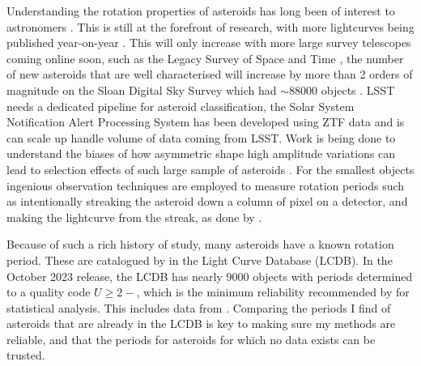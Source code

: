 \documentclass[12pt]{article}
\begin{document}
Understanding the rotation properties of asteroids has long been of interest to astronomers \citep[e.g.][for early work into the limits of rotation period and the tumbling nature of some small bodies]{Weidenschilling1981,Harris1994}.
This is still at the forefront of research, with more lightcurves being published year-on-year \citep{Harris2015}.
This will only increase with more large survey telescopes coming online soon, such as the Legacy Survey of Space and Time \citep[LSST][]{LSST2019}, the number of new asteroids that are well characterised will increase by more than 2 orders of magnitude on the Sloan Digital Sky Survey \citep[SDSS][]{York2000} which had $\sim 88000$ objects \citet{Parker2008}.
LSST needs a dedicated pipeline for asteroid classification, the Solar System Notification Alert Processing System \citep[SNAPS][]{Trilling2023} has been developed using ZTF data and is can scale up handle volume of data coming from LSST.
Work is being done to understand the biases of how  asymmetric shape high amplitude variations can lead to selection effects of such large sample of asteroids \citet{Levine2023}.
For the smallest objects ingenious observation techniques are employed to measure rotation periods such as intentionally streaking the asteroid down a column of pixel on a detector, and making the lightcurve from the streak, as done by \citet{Bolin2023}.

Because of such a rich history of study, many asteroids have a known rotation period.
These are catalogued by \citet{Warner2009} %
in the Light Curve Database (LCDB).
In the October  2023 release, the LCDB has nearly 9000 objects with periods determined to a quality code $U\geq 2-$, which is the minimum reliability recommended by \citeauthor{Warner2009} for statistical analysis.
This includes data from \citet{Pal2020}.
Comparing the periods I find of asteroids that are already in the LCDB is key to making sure my methods are reliable, and that the periods for asteroids for which no data exists can be trusted.
\end{document}
